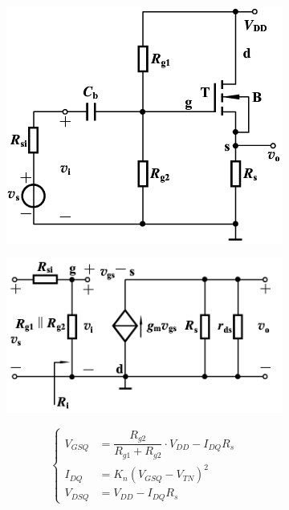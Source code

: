 \begin{figure}[H]
  \centering
  \begin{subfigure}{.3\textwidth}
    \centering
    \includegraphics[width=\linewidth]{figures/MOSFET-Common-D}
  \end{subfigure}
  \begin{subfigure}{.6\textwidth}
    \centering
    \includegraphics[width=\linewidth]{figures/MOSFET-Common-Ds}
  \end{subfigure}
\end{figure}

\begin{equation*}
  \left\{
  \begin{aligned}
    V_{GSQ} &= \dfrac{R_{g2}}{R_{g1} + R_{g2}} \cdot V_{DD} - I_{DQ} R_s  \\
    I_{DQ} &= K_n \left( V_{GSQ} - V_{TN} \right)^2 \\
    V_{DSQ} &= V_{DD} - I_{DQ} R_s
  \end{aligned}
  \right.
\end{equation*}

